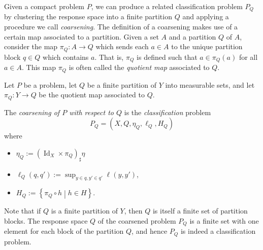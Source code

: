 \documentclass[twoside,11pt]{article}
\DeclareMathOperator{\id}{Id}
\newcommand{\set}[2]{\left\{ #1\middle| #2\right\}}
\begin{document}
    Given a compact problem $P$, we can produce a related classification problem $P_Q$ by clustering the response space into a finite partition $Q$ and applying a procedure we call \emph{coarsening}.
    The definition of a coarsening makes use of a certain map associated to a partition. Given a set $A$ and a partition $Q$ of $A$, consider the map $\pi_Q:A\to Q$ which sends each $a\in A$ to the unique partition block $q\in Q$ which contains $a$. That is, $\pi_Q$ is defined such that $a\in \pi_Q(a)$ for all $a\in A$. This map $\pi_Q$ is often called the \emph{quotient map} associated to $Q$.
    \begin{definition}[Coarsening] \label{def:coarsening}
        Let $P$ be a problem, let $Q$ be a finite partition of $Y$ into measurable sets, and let $\pi_Q:Y\to Q$ be the quotient map associated to $Q$.
        
        The \emph{coarsening of $P$ with respect to $Q$} is the \emph{classification} problem
        \[P_Q = (X,Q,\eta_Q,\ell_Q,H_Q)\]
        where
        \begin{itemize}
          \item $\eta_Q := (\id_X \times \pi_Q)_\sharp \eta$
          \item $\ell_Q(q,q') := \sup_{y\in q, y'\in q'} \ell(y,y')$,
          \item $H_Q := \set{\pi_Q\circ h}{h\in H}$.
        \end{itemize}
    \end{definition}



Note that if $Q$ is a finite partition of $Y$, then $Q$ is itself a finite set of partition blocks. The response space $Q$ of the coarsened problem $P_Q$ is a finite set with one element for each block of the partition $Q$, and hence $P_Q$ is indeed a classification problem.
\end{document}
